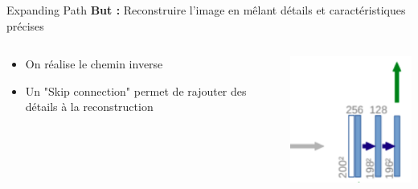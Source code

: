 \documentclass{beamer}
\begin{document}
        \begin{frame}{Expanding Path}
        \textbf{But :} Reconstruire l'image en mêlant détails et caractéristiques précises
        \begin{columns}
        \begin{column}{0.5\textwidth}
            \begin{itemize}
                \item On réalise le chemin inverse
                \item Un "Skip connection" permet de rajouter des détails à la reconstruction
            \end{itemize}
        \end{column}
        
        \begin{column}{0.25\textwidth}
            \includegraphics[width=\textwidth]{UNet expanding.png}
        \end{column}
        \end{columns}
        
        \end{frame}
	
\end{document}
